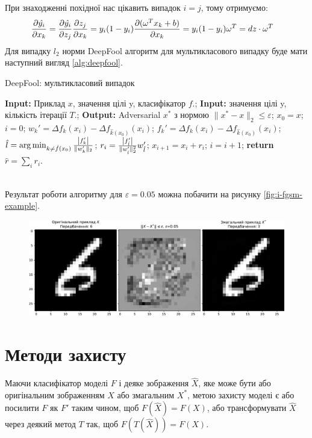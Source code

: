 \documentclass[a4paper,14pt]{extreport}
\renewcommand{\algorithmicrequire}{\textbf{Input: }}
\renewcommand{\algorithmicensure}{\textbf{Output: }}
\newcommand{\algorithmreturn}{\textbf{return }}
\newcommand{\tran}{^{T}}
\begin{document}
	При знаходженні похідної нас цікавить випадок $i = j$, тому отримуємо:
	\begin{align*}
	\pdv{\hat{y_i}}{x_k} 
	&=
	\pdv{\hat{y_i}}{z_j} \pdv{z_j}{x_k} 
	=
	y_i(1-y_i) \pdv{(\omega\tran x_k + b)}{x_k} 
	=
	y_i(1-y_i) \omega\tran 
	=
	dz \cdot \omega\tran
	\end{align*}
	Для випадку $l_2$ норми DeepFool алгоритм для мультикласового випадку буде мати наступний вигляд \ref{alg:deepfool}.
	\begin{algorithm}
		\caption{DeepFool: мультикласовий випадок}
		\label{alg:deepfool}
		\begin{algorithmic}[1]
			\State \algorithmicrequire{Приклад $x$, значення цілі y, класифікатор $f$.};
			\State \algorithmicrequire{значення цілі y, кількість ітерації $T$.};
			\State \algorithmicensure{ Adversarial $x^{*}$ з нормою $\|x^{*} - x\|_{2} \leq \varepsilon $};
			\State $x_0 = x$; $i = 0$; 
					\State $ w_{k}' = \Delta f_k(x_i) - \Delta f_{\hat{k}(x_0)} (x_i)$;
					\State $ f_{k}' = \Delta f_k(x_i) - \Delta f_{\hat{k}(x_0)} (x_i)$;
				\EndFor
				\State $\hat{l} = \arg \min_{k \neq \hat{f}(x_0)} \frac{\abs{f_{k}'}}{\|w_{k}'\|_2}$;
				\State $r_i = \frac{\abs{f_{\hat{l}}'}}{\|w_{\hat{l}}'\|_{2}^{2}} w_{\hat{l}}'$;
				\State $x_{i+1} = x_i + r_i$;
				\State $i = i + 1$;
			\EndWhile
			\State \algorithmreturn{$\hat{r} = \sum_{i} r_i $}.
		\end{algorithmic}
	\end{algorithm}
	\\	
	Результат роботи алгоритму для $\varepsilon = 0.05$ можна побачити на рисунку \ref{fig:i-fgsm-example}.
	\begin{figure}[h]
		\centering
		\includegraphics[width=1\textwidth]{resources/deepfool-example.pdf}
		\caption{}
		\label{fig:deepfool-example}
	\end{figure}
	
	\chapter{Методи захисту}
	Маючи класифікатор моделі $F$ і деяке зображення $\hat{X}$, яке може бути або оригінальним зображенням $X$ або змагальним $X^{*}$, метою захисту моделі є або посилити $F$ як $F'$ таким чином, щоб $F(\hat{X}) = F(X)$, або трансформувати $\hat{X}$ через деякий метод $T$ так, щоб $F(T(\hat{X})) = F(X)$.
	
\end{document}
